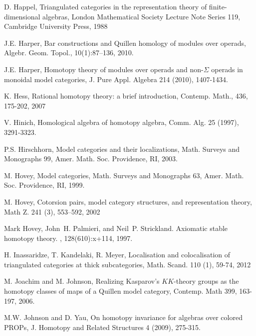 \documentclass[11pt,reqno]{amsart}
\theoremstyle{definition}
\numberwithin{equation}{subsection}
\begin{document}
\begin{thebibliography}{AAAAAA}
 D. Happel, Triangulated categories in the representation theory of finite-dimensional algebras, London Mathematical Society Lecture Note Series 119, Cambridge University Press, 1988

J.E. Harper, Bar constructions and Quillen homology of modules over operads, Algebr. Geom. Topol., 10(1):87--136, 2010. 



J.E. Harper, Homotopy theory of modules over operads and non-$\Sigma$ operads in monoidal model categories, J. Pure Appl. Algebra 214 (2010), 1407-1434.



 K. Hess, Rational homotopy theory: a brief introduction, Contemp. Math., 436, 175-202, 2007

V. Hinich, Homological algebra of homotopy algebra, Comm. Alg. 25 (1997), 3291-3323.


P.S. Hirschhorn, Model categories and their localizations, Math. Surveys and Monographs 99, Amer. Math. Soc. Providence, RI, 2003.


M. Hovey, Model categories, Math. Surveys and Monographs 63, Amer. Math. Soc. Providence, RI, 1999.

 M. Hovey, Cotorsion pairs, model category structures, and representation theory, Math Z. 241 (3), 553--592, 2002

Mark Hovey, John~H. Palmieri, and Neil~P. Strickland.
\newblock Axiomatic stable homotopy theory.
, 128(610):x+114, 1997.

 H. Inassaridze, T. Kandelaki, R. Meyer, Localisation and colocalisation of triangulated categories at thick subcategories, Math. Scand. 110 (1), 59-74, 2012

 M. Joachim and M. Johnson, Realizing {K}asparov's {$KK$}-theory groups as the homotopy classes of maps of a {Q}uillen model category, Contemp. Math 399, 163-197, 2006.

M.W. Johnson and D. Yau, On homotopy invariance for algebras over colored PROPs, J. Homotopy and Related Structures 4 (2009), 275-315.






\end{thebibliography}
\end{document}
